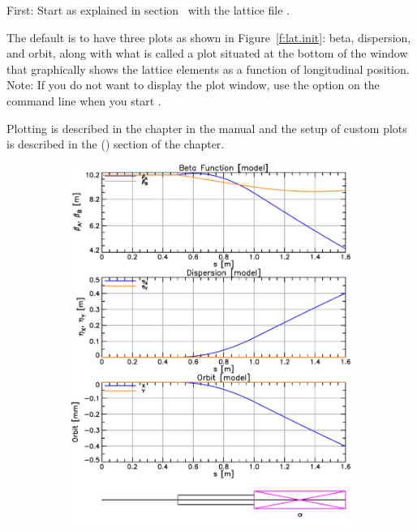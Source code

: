 \documentclass{hitec}     %
\begin{document}
First: Start \tao as explained in section~ with the lattice file
.

The default is to have three plots as shown in Figure~\ref{f:lat.init}: beta, dispersion, and orbit,
along with what is called a  plot situated at the bottom of the window that
graphically shows the lattice elements as a function of longitudinal position. Note: If you do not
want \tao to display the plot window, use the  option on the command line when you start
\tao.

Plotting is described in the  chapter in the \tao manual and the setup of custom plots
is described in the  () section of the  chapter.

\begin{figure}[hb]
  \centering
  \begin{subfigure}[t]{0.47\textwidth}
    \includegraphics[width=\textwidth]{lat-init.pdf}

\end{subfigure}
\end{figure}
\end{document}
